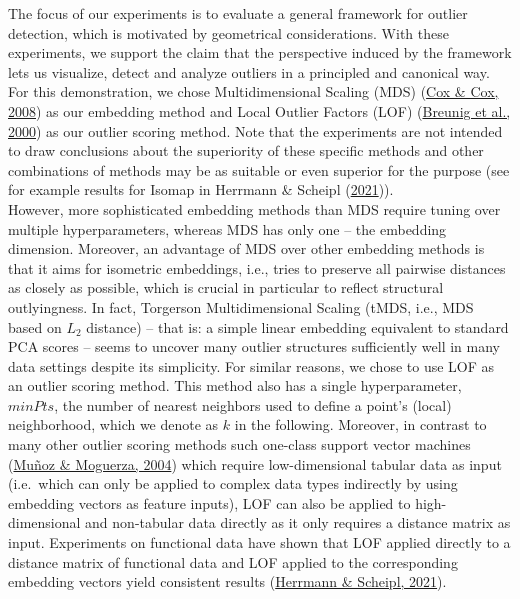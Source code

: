 \documentclass[
  10pt]{article}
\begin{document}
The focus of our experiments is to evaluate a general framework for outlier detection, which is motivated by geometrical considerations. With these experiments, we support the claim that the perspective induced by the framework lets us visualize, detect and analyze outliers in a principled and canonical way. For this demonstration,
we chose Multidimensional Scaling (MDS) (\protect\hyperlink{ref-cox2008multidimensional}{Cox \& Cox, 2008}) as our embedding method and Local Outlier Factors (LOF) (\protect\hyperlink{ref-breunig2000lof}{Breunig et al., 2000}) as our outlier scoring method. Note that the experiments are not intended to
draw conclusions about the superiority of these specific methods and other combinations of methods may be as suitable or even superior for the purpose (see for example results for Isomap in Herrmann \& Scheipl (\protect\hyperlink{ref-herrmann2021geometric}{2021})).\\
However, more sophisticated embedding methods than MDS require tuning over multiple hyperparameters, whereas MDS has only one -- the embedding dimension. Moreover, an advantage of MDS over other embedding methods is that it aims for isometric embeddings, i.e.,
tries to preserve all pairwise distances as closely as possible, which is crucial in particular to reflect structural outlyingness. In fact, Torgerson Multidimensional Scaling (tMDS, i.e., MDS based on \(L_2\) distance) -- that is: a simple linear embedding equivalent to standard PCA scores -- seems to uncover many outlier structures sufficiently well in many data settings despite its simplicity.
For similar reasons, we chose to use LOF as an outlier scoring method. This method also has a single hyperparameter, \(minPts\), the number of nearest neighbors used to define a point's (local) neighborhood, which we denote as \(k\) in the following. Moreover, in contrast to many other outlier scoring methods such one-class support vector machines (\protect\hyperlink{ref-munoz2004one}{Muñoz \& Moguerza, 2004}) which require low-dimensional tabular data as input (i.e.~which can only be applied to complex data types indirectly by using embedding vectors as feature inputs), LOF can also be applied to high-dimensional and non-tabular data directly as it only requires a distance matrix as input. Experiments on functional data have shown that LOF applied directly to a distance matrix of functional data and LOF applied to the corresponding embedding vectors yield consistent results (\protect\hyperlink{ref-herrmann2021geometric}{Herrmann \& Scheipl, 2021}).\\
\end{document}
